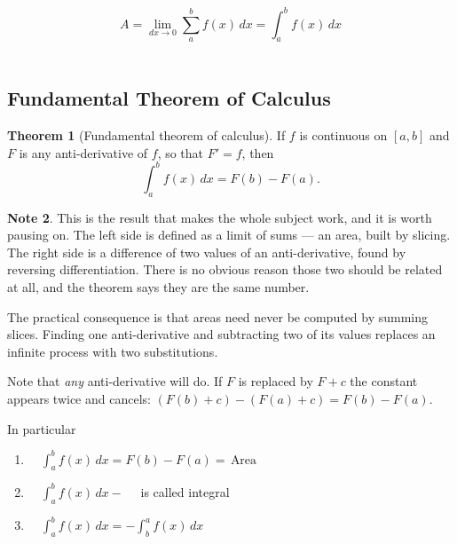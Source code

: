 \documentclass[11pt,a4paper]{article}
\theoremstyle{definition}
\newtheorem{thm}{Theorem}[section]
\newtheorem{note}[thm]{Note}
\begin{document}
$$A = \lim\limits_{dx \rightarrow 0} \sum^b_a f(x)\,dx = \int^b_a f(x)\,dx$$\\








\subsection{Fundamental Theorem of Calculus}

\begin{thm}[Fundamental theorem of calculus]
If $f$ is continuous on $[a,b]$ and $F$ is any anti-derivative of $f$, so that
$F'=f$, then
$$\int^{b}_{a} f(x)\,dx = F(b)-F(a).$$
\end{thm}

\begin{note}
This is the result that makes the whole subject work, and it is worth pausing on.
The left side is defined as a limit of sums --- an area, built by slicing. The right
side is a difference of two values of an anti-derivative, found by reversing
differentiation. There is no obvious reason those two should be related at all,
and the theorem says they are the same number.

The practical consequence is that areas need never be computed by summing slices.
Finding one anti-derivative and subtracting two of its values replaces an infinite
process with two substitutions.

Note that \emph{any} anti-derivative will do. If $F$ is replaced by $F+c$ the
constant appears twice and cancels: $(F(b)+c)-(F(a)+c)=F(b)-F(a)$.
\end{note}

In particular

\begin{enumerate}
\item[] $\quad  \displaystyle{\int^b_a f(x)\,dx = F(b) - F(a) = \,\text{Area}}$\\

\item[] $\quad \displaystyle{\int^b_a f(x)\,dx - \quad }$ is called integral\\

\item[] $\quad \displaystyle{\int^b_a f(x)\,dx = -\int^a_b f(x)\,dx}$
\end{enumerate}


\end{document}
